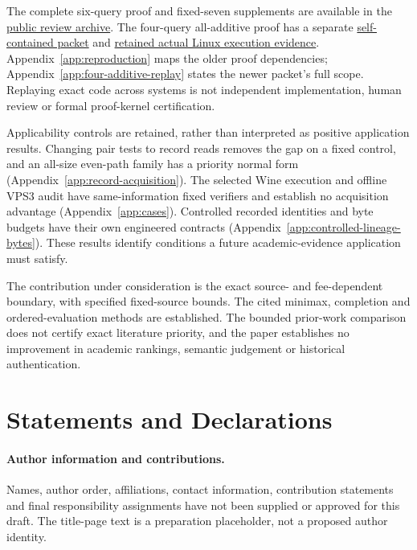 \documentclass[pdflatex,sn-mathphys-num]{sn-jnl}
\theoremstyle{thmstyleone}
\theoremstyle{thmstylethree}
\theoremstyle{thmstyletwo}
\begin{document}
The complete six-query proof and fixed-seven supplements are available
in the \href{https://github.com/SHiJiE1115/newproj/releases/tag/complete-six-review-20261011-v01}{public review archive}.
The four-query all-additive proof has a separate
\href{https://github.com/SHiJiE1115/newproj/tree/837498553f02739d60d3c53f79b8141ac4f5e105/theory/four_query_additive_v01}{self-contained packet}
and \href{https://github.com/SHiJiE1115/newproj/tree/468d5a4df39611102c8b08aaecd8a05d6a6582b1/evidence/four_additive_hosted_v01}{retained actual Linux execution evidence}.
Appendix~\ref{app:reproduction} maps the older proof dependencies;
Appendix~\ref{app:four-additive-replay} states the newer packet's full
scope. Replaying exact code across systems is not independent
implementation, human review or formal proof-kernel certification.

Applicability controls are retained, rather than interpreted as positive
application results. Changing pair tests to record reads removes the gap
on a fixed control, and an all-size even-path family has a priority normal
form (Appendix~\ref{app:record-acquisition}). The selected Wine execution
and offline VPS3 audit have same-information fixed verifiers and establish
no acquisition advantage (Appendix~\ref{app:cases}). Controlled recorded
identities and byte budgets have their own engineered contracts
(Appendix~\ref{app:controlled-lineage-bytes}). These results identify
conditions a future academic-evidence application must satisfy.

The contribution under consideration is the exact source- and fee-dependent
boundary, with specified fixed-source bounds. The cited minimax,
completion and ordered-evaluation methods are established. The bounded
prior-work comparison does not certify exact literature priority, and
the paper establishes no improvement in academic rankings, semantic
judgement or historical authentication.
\label{page:main-end}

\backmatter
\section*{Statements and Declarations}
\paragraph*{Author information and contributions.}
Names, author order, affiliations, contact information, contribution statements and final responsibility assignments have not been supplied or approved for this draft. The title-page text is a preparation placeholder, not a proposed author identity.
\end{document}
